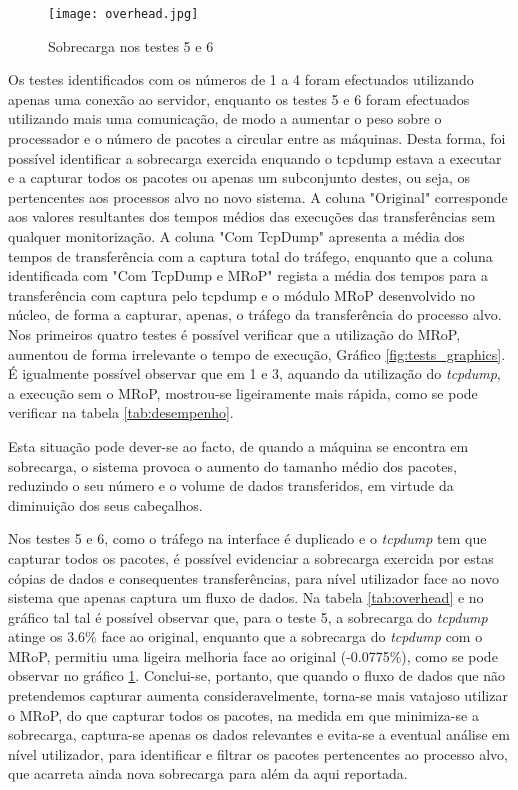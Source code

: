 \begin{figure}[!ht]
\centering
\texttt{[image: overhead.jpg]}
\caption{Sobrecarga nos testes 5 e 6 }
\label{fig:tests_overhead}
\end{figure}

Os testes identificados com os números de 1 a 4 foram efectuados utilizando apenas uma conexão ao servidor, enquanto os testes 5 e 6 foram efectuados utilizando mais uma comunicação, de modo a aumentar o peso sobre o processador e o número de pacotes a circular entre as máquinas.
Desta forma, foi possível identificar a sobrecarga exercida enquando o tcpdump estava a executar e a capturar todos os pacotes ou apenas um subconjunto destes, ou seja, os pertencentes aos processos alvo no novo sistema.
A coluna "Original" corresponde aos valores resultantes dos tempos médios das execuções das transferências sem qualquer monitorização.
A coluna "Com TcpDump" apresenta a média dos tempos de transferência com a captura total do tráfego, enquanto que a coluna identificada com "Com TcpDump e MRoP" regista a média dos tempos para a transferência com captura pelo tcpdump e o módulo MRoP desenvolvido no núcleo, de forma a capturar, apenas, o tráfego da transferência do processo alvo.
Nos primeiros quatro testes é possível verificar que a utilização do MRoP, aumentou de forma irrelevante o tempo de execução, Gráfico \ref{fig:tests_graphics}.
É igualmente possível observar que em 1 e 3, aquando da utilização do \textit{tcpdump}, a execução sem o MRoP, mostrou-se ligeiramente mais rápida, como se pode verificar na tabela \ref{tab:desempenho}.


Esta situação pode dever-se ao facto, de quando a máquina se encontra em sobrecarga, o sistema provoca o aumento do tamanho médio dos pacotes, reduzindo o seu número e o volume de dados transferidos, em virtude da diminuição dos seus cabeçalhos.

Nos testes 5 e 6, como o tráfego na interface é duplicado e o \textit{tcpdump} tem que capturar todos os pacotes, é possível evidenciar a sobrecarga exercida por estas cópias de dados e consequentes transferências, para nível utilizador face ao novo sistema que apenas captura um fluxo de dados.
Na tabela \ref{tab:overhead} e no gráfico tal tal é possível observar que, para o teste 5, a sobrecarga do \textit{tcpdump} atinge os 3.6\% face ao original, enquanto que a sobrecarga do \textit{tcpdump} com o MRoP, permitiu uma ligeira melhoria face ao original (-0.0775\%), como se pode observar no gráfico \ref{fig:tests_overhead}.
Conclui-se, portanto, que quando o fluxo de dados que não pretendemos capturar aumenta consideravelmente, torna-se mais vatajoso utilizar o MRoP, do que capturar todos os pacotes, na medida em que minimiza-se a sobrecarga, captura-se apenas os dados relevantes e evita-se a eventual análise em nível utilizador, para identificar e filtrar os pacotes pertencentes ao processo alvo, que acarreta ainda nova sobrecarga para além da aqui reportada.

